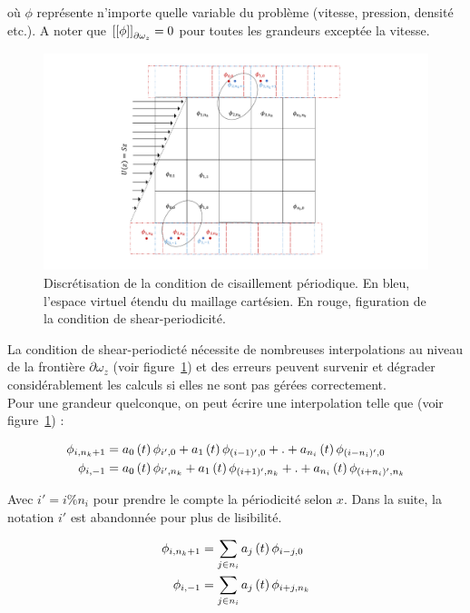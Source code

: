 où $\phi$ représente n'importe quelle variable du problème (vitesse, pression, densité etc.). A noter que $\left[ \left[ \phi\right]\right]_{\partial\omega_z}=0$ pour toutes les grandeurs exceptée la vitesse. 

\begin{figure}[h]
   \centering
   \includegraphics[scale=0.6]{figures/discretisation_ShearBC.pdf}
   \caption{\label{discretisation} Discrétisation de la condition de cisaillement périodique. En bleu, l'espace virtuel étendu du maillage cartésien. En rouge, figuration de la condition de shear-periodicité.}
\end{figure} 

La condition de shear-periodicté nécessite de nombreuses interpolations au niveau de la frontière $\partial\omega_z$ (voir figure~\ref{discretisation}) et des erreurs peuvent survenir et dégrader considérablement les calculs si elles ne sont pas gérées correctement. \\

Pour une grandeur quelconque, on peut écrire une interpolation telle que (voir figure~\ref{discretisation}) :

\begin{align}
\phi_{i,n_k+1}&=a_0\left( t\right)\phi_{i',0}+a_1\left( t\right)\phi_{(i-1)',0}+.+a_{n_i}\left( t\right)\phi_{(i-n_i)',0}\label{interpol}\\
\phi_{i,-1}&=a_0\left( t\right)\phi_{i',n_k}+a_1\left( t\right)\phi_{(i+1)',n_k}+.+a_{n_i}\left( t\right)\phi_{(i+n_i)',n_k}\label{interpol2}
\end{align}

Avec $i'=i\%n_i$ pour prendre le compte la périodicité selon $x$. Dans la suite, la notation $i'$ est abandonnée pour plus de lisibilité. 

\begin{align}
\phi_{i,n_k+1}&=\sum_{j\in n_i} a_j\left( t\right)\phi_{i-j,0}\label{interpol}\\
\phi_{i,-1}&=\sum_{j\in n_{i}}a_j\left( t\right)\phi_{i+j,n_k}\label{interpol2}
\end{align}
 
